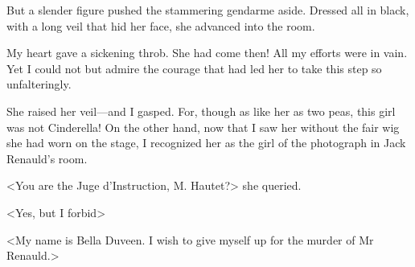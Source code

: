  But a slender figure pushed the stammering gendarme aside. Dressed all in black, with a long veil that hid her face, she advanced into the room. 

 My heart gave a sickening throb. She had come then! All my efforts were in vain. Yet I could not but admire the courage that had led her to take this step so unfalteringly. 

 She raised her veil—and I gasped. For, though as like her as two peas, this girl was not Cinderella! On the other hand, now that I saw her without the fair wig she had worn on the stage, I recognized her as the girl of the photograph in Jack Renauld's room. 

 <You are the Juge d'Instruction, M. Hautet?> she queried. 

 <Yes, but I forbid\longdash> 

 <My name is Bella Duveen. I wish to give myself up for the murder of Mr Renauld.>